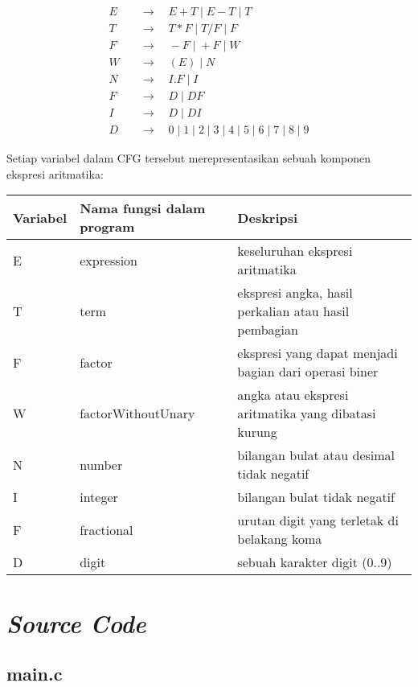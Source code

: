 \documentclass[a4paper,titlepage]{article}
\begin{document}
		\begin{align*}
			E \quad & \rightarrow \quad E+T \; | \; E-T \; | \; T \\
			T \quad & \rightarrow \quad T*F \; | \; T/F \; | \; F \\
			F \quad & \rightarrow \quad -F \; | \; +F \; | \; W \\
			W \quad & \rightarrow \quad (E) \; | \; N \\
			N \quad & \rightarrow \quad I.F \; | \; I \\
			F \quad & \rightarrow \quad D \; | \; DF \\
			I \quad & \rightarrow \quad D \; | \; DI \\
			D \quad & \rightarrow \quad 0 \; | \; 1 \; | \; 2 \; | \; 3 \; | \; 4 \; | \; 5 \; | \; 6 \; | \; 7 \; | \; 8 \; | \; 9
		\end{align*}

		\noindent Setiap variabel dalam CFG tersebut merepresentasikan sebuah komponen ekspresi aritmatika:

		\begin{table}[H]
			\centering
			\begin{tabular}{@{}lll@{}}
				\toprule
				Variabel & Nama fungsi dalam program & Deskripsi \\ \midrule
				E & expression 			& keseluruhan ekspresi aritmatika \\
				T & term 				& ekspresi angka, hasil perkalian atau hasil pembagian \\
				F & factor 				& ekspresi yang dapat menjadi bagian dari operasi biner \\
				W & factorWithoutUnary 	& angka atau ekspresi aritmatika yang dibatasi kurung \\
				N & number 				& bilangan bulat atau desimal tidak negatif \\
				I & integer 			& bilangan bulat tidak negatif \\
				F & fractional 			& urutan digit yang terletak di belakang koma \\
				D & digit 				& sebuah karakter digit (0..9) \\
			\end{tabular}
		\end{table}

	\section{\textit{Source Code}}

		\subsection{main.c}
			
\end{document}
